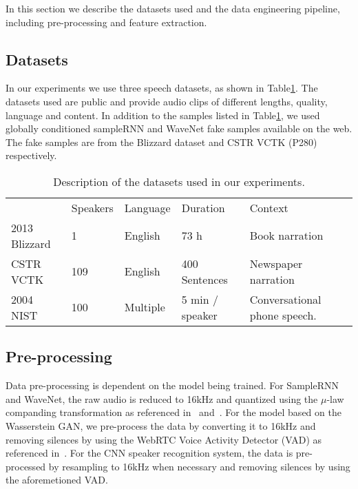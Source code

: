 In this section we describe the datasets used and the data engineering
pipeline, including pre-processing and feature extraction.

\subsection{Datasets}
In our experiments we use three speech datasets, as shown  
in Table\ref{tbl:datasets}. The datasets used are public and provide audio clips
of different lengths, quality, language and content. In addition to the samples listed in Table\ref{tbl:datasets}, we used  globally conditioned sampleRNN and WaveNet fake samples available on the web. The fake samples are from the Blizzard dataset and CSTR VCTK (P280) respectively.

\begin{table}[!h]
\centering
\begin{tabular}{lllll}
                                                                     & \cellcolor[HTML]{C0C0C0}Speakers & \cellcolor[HTML]{C0C0C0}Language & \cellcolor[HTML]{C0C0C0}Duration & \cellcolor[HTML]{C0C0C0}Context \\ \cline{2-5} 
\multicolumn{1}{l|}{\cellcolor[HTML]{C0C0C0}2013 Blizzard} & 1                                & English                          & 73 h                             & Book narration                  \\
\multicolumn{1}{l|}{\cellcolor[HTML]{C0C0C0}CSTR VCTK}               & 109                              & English                          & 400 Sentences                    & Newspaper narration               \\
\multicolumn{1}{l|}{\cellcolor[HTML]{C0C0C0}2004 NIST}               & 100                              & Multiple                         & 5 min / speaker                  & Conversational phone speech.                          
\end{tabular}
\bigskip
\caption{Description of the datasets used in our experiments. }
\label{tbl:datasets}
\end{table}

\subsection{Pre-processing}
\label{sub:processdata}
Data pre-processing is dependent on the model being trained. For SampleRNN and
WaveNet, the raw audio is reduced to 16kHz and quantized using the $\mu$-law
companding transformation as referenced in~\cite{mehri2016samplernn}
and~\cite{van2016wavenet}. For the model based on the Wasserstein GAN,
we pre-process the data by converting it to 16kHz and removing silences by using
the WebRTC Voice Activity Detector (VAD) as referenced
in~\cite{zeidan2014webrtc}. For the CNN speaker recognition system, the data is
pre-processed by resampling to 16kHz when necessary and removing silences by
using the aforemetioned VAD. 

